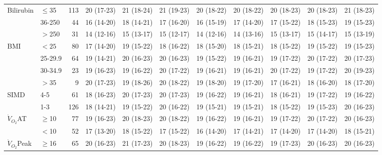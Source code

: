 \begin{sidewaystable}[p]
\begin{tabular}{|llr | c c c c c c c c|}
		Bilirubin           & $\leq$35  & 113 & 20 (17-23) & 21 (18-24) & 21 (19-23) & 20 (18-22) & 20 (18-22) & 20 (18-23) & 20 (18-23) & 21 (18-23) \\
		                    & 36-250    &  44 & 16 (14-20) & 18 (14-21) & 17 (16-20) & 16 (15-19) & 17 (14-20) & 17 (15-22) & 18 (15-23) & 19 (15-23) \\
		                    & $>$250    &  31 & 14 (12-16) & 15 (13-17) & 15 (12-17) & 14 (12-16) & 14 (13-16) & 15 (13-17) & 15 (14-17) & 15 (13-19) \\
		BMI                 & $<25$     &  80 & 17 (14-20) & 19 (15-22) & 18 (16-22) & 18 (15-20) & 18 (15-21) & 18 (15-22) & 19 (15-22) & 19 (15-23) \\
		                    & 25-29.9   &  64 & 19 (14-21) & 20 (16-23) & 20 (16-23) & 19 (15-22) & 19 (16-21) & 19 (17-22) & 20 (17-22) & 20 (17-23) \\
		                    & 30-34.9   &  23 & 19 (16-23) & 19 (16-22) & 20 (17-22) & 19 (16-21) & 19 (16-21) & 20 (17-22) & 19 (17-22) & 20 (19-23) \\
		                    & $>$35     &   9 & 20 (17-23) & 19 (18-26) & 20 (18-22) & 19 (18-20) & 19 (17-20) & 17 (16-21) & 18 (16-20) & 18 (17-20) \\
		SIMD                & 4-5       &  61 & 18 (16-23) & 20 (17-23) & 20 (17-23) & 19 (16-22) & 19 (16-21) & 18 (16-21) & 19 (17-22) & 19 (16-22) \\
		                    & 1-3       & 126 & 18 (14-21) & 19 (15-22) & 20 (16-22) & 19 (15-21) & 19 (15-21) & 18 (15-22) & 19 (15-23) & 20 (16-23) \\
		$\dot{V}_{O_2}$AT   & $\geq$10  &  77 & 19 (16-23) & 20 (18-23) & 20 (18-22) & 19 (16-22) & 19 (16-21) & 19 (17-22) & 20 (17-22) & 20 (16-23) \\
		                    & $<$10     &  52 & 17 (13-20) & 18 (15-22) & 17 (15-22) & 16 (14-20) & 17 (14-21) & 17 (14-20) & 17 (14-20) & 18 (15-21) \\
		$\dot{V}_{O_2}$Peak & $\geq$16 &  65 & 20 (16-23) & 21 (17-23) & 20 (18-23) & 19 (16-22) & 19 (16-22) & 19 (17-23) & 20 (16-23) & 20 (16-23) \\

\end{tabular}
\end{sidewaystable}
